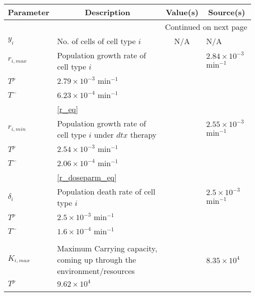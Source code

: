 \newpage
\begin{longtable}[c]{|l|p{4.3cm}|c|p{2.3cm}|}

  \hline \multicolumn{1}{|c|}{\textbf{Parameter}} & \multicolumn{1}{c|}{\textbf{Description}} & \multicolumn{1}{c|}{\textbf{Value(s)}} & \multicolumn{1}{c|}{\textbf{Source(s)}}\\ \hline
  \endhead

  \hline \multicolumn{4}{|r|}{{Continued on next page}} \\ \hline
  \endfoot

  \endlastfoot

  $y_i$ & No. of cells of cell type $i$ & N/A & N/A  \\ \hline
  $r_{i,max}$ & Population growth rate of cell type $i$  &
  \begin{tabular}{l|l}
    $T^+$ & $2.84 \times 10^{-3}$ \tiny{min$^{-1}$}\\
    $T^p$ & $2.79 \times 10^{-3}$ \tiny{min$^{-1}$}\\
    $T^-$ & $6.23 \times 10^{-4}$ \tiny{min$^{-1}$}\\
  \end{tabular}
  & \autoref{r_eq} \\ \hline
  $r_{i,min}$ & Population growth rate of cell type $i$ under $dtx$ therapy &
  \begin{tabular}{l|l}
    $T^+$ & $2.55 \times 10^{-3}$ \tiny{min$^{-1}$}\\
    $T^p$ & $2.54 \times 10^{-3}$ \tiny{min$^{-1}$}\\
    $T^-$ & $2.06 \times 10^{-4}$ \tiny{min$^{-1}$}\\
  \end{tabular}
  & \autoref{r_doseparm_eq} \\ \hline
  $\delta_i$  & Population death rate of cell type $i$ &
  \begin{tabular}{l|l}
    $T^+$ & $2.5 \times 10^{-3}$ \tiny{min$^{-1}$}\\
    $T^p$ & $2.5 \times 10^{-3}$ \tiny{min$^{-1}$}\\
    $T^-$ & $1.6 \times 10^{-4}$ \tiny{min$^{-1}$}\\
  \end{tabular}
  & \cite{Jain}  \\ \hline
  $K_{i,max}$ & Maximum Carrying capacity, coming up through the environment/resources &
  \begin{tabular}{l|l}
    $T^+$ & $8.35 \times 10^4$ \\
    $T^p$ & $9.62 \times 10^4$ \\

\end{tabular}
\end{longtable}
